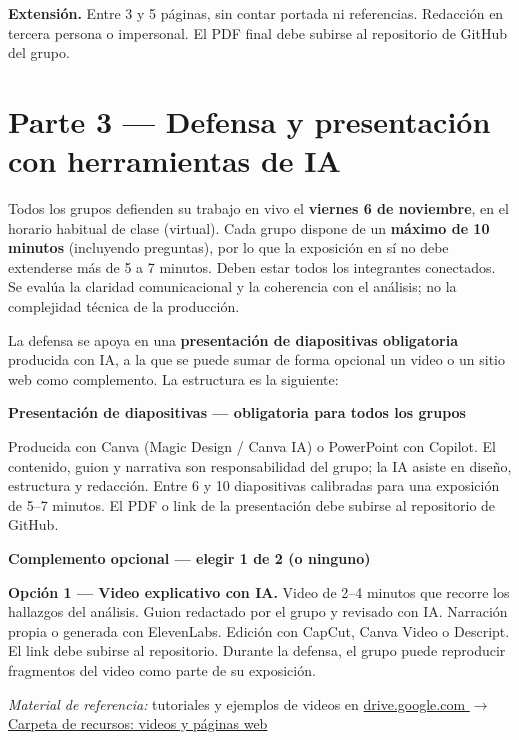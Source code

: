 \documentclass[11pt,a4paper]{article}
\newcommand{\FechaDefensa}{viernes 6 de noviembre}
\begin{document}
\begin{nota}
\textbf{Extensión.} Entre 3 y 5 páginas, sin contar portada ni referencias. Redacción en tercera
persona o impersonal. El PDF final debe subirse al repositorio de GitHub del grupo.
\end{nota}

\section{Parte 3 --- Defensa y presentación con herramientas de IA}
Todos los grupos defienden su trabajo en vivo el \textbf{\FechaDefensa}, en el horario
habitual de clase (virtual). Cada grupo dispone de un \textbf{máximo de 10 minutos} (incluyendo preguntas),
por lo que la exposición en sí no debe extenderse más de 5 a 7 minutos. Deben estar todos los
integrantes conectados. Se evalúa la claridad comunicacional y la coherencia con el análisis; no la
complejidad técnica de la producción.

La defensa se apoya en una \textbf{presentación de diapositivas obligatoria} producida con IA, a la
que se puede sumar de forma opcional un video o un sitio web como complemento. La estructura
es la siguiente:

\begin{caja}
\textbf{Presentación de diapositivas --- obligatoria para todos los grupos}

Producida con Canva (Magic Design / Canva IA) o PowerPoint con Copilot. El contenido,
guion y narrativa son responsabilidad del grupo; la IA asiste en diseño, estructura y redacción.
Entre 6 y 10 diapositivas calibradas para una exposición de 5--7 minutos. El PDF o link de la
presentación debe subirse al repositorio de GitHub.
\end{caja}

\textbf{Complemento opcional --- elegir 1 de 2 (o ninguno)}

\begin{caja}
\textbf{Opción 1 --- Video explicativo con IA.} Video de 2--4 minutos que recorre los hallazgos
del análisis. Guion redactado por el grupo y revisado con IA. Narración propia o generada
con ElevenLabs. Edición con CapCut, Canva Video o Descript. El link debe subirse al
repositorio. Durante la defensa, el grupo puede reproducir fragmentos del video como parte
de su exposición.

\smallskip
\emph{Material de referencia:} tutoriales y ejemplos de videos en
\href{https://drive.google.com/drive/folders/1x0gSDeycByC-HAt3AUxWFzJ3Co_mkMpl?usp=drive_link}{drive.google.com $\rightarrow$ Carpeta de recursos: videos y páginas web}
\end{caja}
\end{document}

